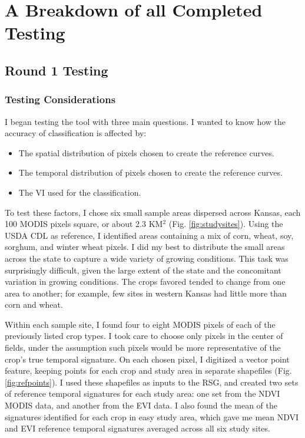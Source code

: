 \chapter{A Breakdown of all Completed Testing}

\section{Round 1 Testing}
\subsection*{Testing Considerations}

I began testing the tool with three main questions. I wanted to know how the accuracy of classification is affected by:

\begin{Spacing}{1.2}
\begin{itemize}
  \item The spatial distribution of pixels chosen to create the reference curves.
  \item The temporal distribution of pixels chosen to create the reference curves.
  \item The VI used for the classification.
\end{itemize}
\end{Spacing}

To test these factors, I chose six small sample areas dispersed across Kansas, each 100 MODIS pixels square, or about 2.3 KM$^2$ (Fig. \ref{fig:studysites}). Using the USDA CDL as reference, I identified areas containing a mix of corn, wheat, soy, sorghum, and winter wheat pixels. I did my best to distribute the small areas across the state to capture a wide variety of growing conditions. This task was surprisingly difficult, given the large extent of the state and the concomitant variation in growing conditions. The crops favored tended to change from one area to another; for example, few sites in western Kansas had little more than corn and wheat.

Within each sample site, I found four to eight MODIS pixels of each of the previously listed crop types. I took care to choose only pixels in the center of fields, under the assumption such pixels would be more representative of the crop’s true temporal signature. On each chosen pixel, I digitized a vector point feature, keeping points for each crop and study area in separate shapefiles  (Fig. \ref{fig:refpoints}). I used these shapefiles as inputs to the RSG, and created two sets of reference temporal signatures for each study area: one set from the NDVI MODIS data, and another from the EVI data. I also found the mean of the signatures identified for each crop in easy study area, which gave me mean NDVI and EVI reference temporal signatures averaged across all six study sites.

